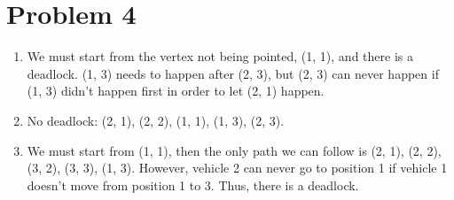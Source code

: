\documentclass[12pt]{article}
\begin{document}
\section*{Problem 4}
\begin{enumerate}
    \item We must start from the vertex not being pointed, (1, 1), and there is a deadlock. (1, 3) needs to happen after (2, 3), but (2, 3) can never happen if (1, 3) didn't happen first in order to let (2, 1) happen.
    \item No deadlock: (2, 1), (2, 2), (1, 1), (1, 3), (2, 3).
    \item We must start from (1, 1), then the only path we can follow is (2, 1), (2, 2), (3, 2), (3, 3), (1, 3).
    However, vehicle 2 can never go to position 1 if vehicle 1 doesn't move from position 1 to 3.
    Thus, there is a deadlock.
\end{enumerate}
\end{document}
